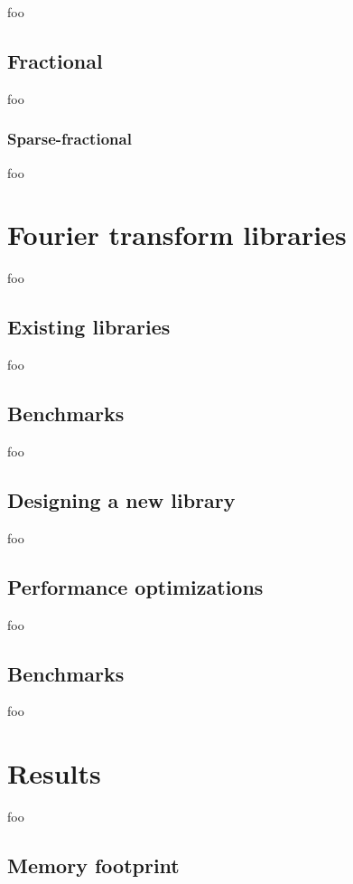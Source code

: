 \documentclass[letter,12pt]{article}
\begin{document}
foo

\subsection{Fractional}

foo

\subsubsection{Sparse-fractional}

foo

\section{Fourier transform libraries}

foo

\subsection{Existing libraries}

foo

\subsection{Benchmarks}

foo

\subsection{Designing a new library}

foo

\subsection{Performance optimizations}

foo

\subsection{Benchmarks}

foo

\section{Results}

foo

\subsection{Memory footprint}
\end{document}
